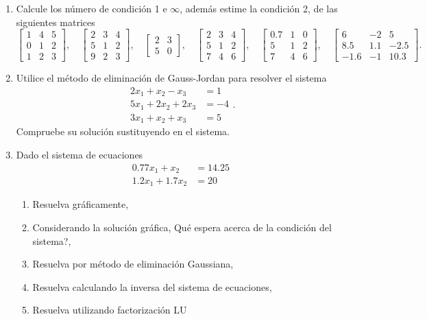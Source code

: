 \documentclass[11pt]{article}
\begin{document}
\begin{enumerate}
\item Calcule los n\'umero de condici\'on 1 e $\infty$, adem\'as estime la condici\'on 2, de las siguientes matrices
$$
\begin{bmatrix}
1 & 4 & 5 \\
0 & 1 & 2\\
1 & 2 & 3
\end{bmatrix}, 
\quad
\begin{bmatrix}
2 & 3 & 4 \\
5 & 1 & 2\\
9 & 2 & 3
\end{bmatrix}, 
\quad
\begin{bmatrix}
2 & 3 \\
5 & 0 
\end{bmatrix}, 
\quad
\begin{bmatrix}
2 & 3 & 4 \\
5 & 1 & 2\\
7 & 4 & 6
\end{bmatrix}, 
\quad
\begin{bmatrix}
0.7 & 1 & 0 \\
5 	& 1 & 2\\
7 	& 4 & 6
\end{bmatrix}, 
\quad
\begin{bmatrix}
6	& -2 	& 5 	\\
8.5 & 1.1	&-2.5 	\\
-1.6&-1 	& 10.3
\end{bmatrix}.
$$


\item Utilice el m\'etodo de eliminaci\'on de Gauss-Jordan para resolver el sistema
$$
\begin{array}{cl}
2x_1+x_2-x_3 	& =1\\
5x_1+2x_2+2x_3 	&=-4\\
3x_1+x_2+x_3	&=5
\end{array}.
$$
Compruebe su soluci\'on sustituyendo en el sistema.



\item Dado el sistema de ecuaciones 
$$
\begin{array}{cl}
0.77x_1+x_2 	&=14.25 \\
1.2x_1+1.7x_2 	&=20
\end{array}
$$

\begin{multicols}{2}
\begin{enumerate}
\item Resuelva gr\'aficamente, 
\item Considerando la soluci\'on gr\'afica, \textquestiondown Qu\'e espera acerca de la condici\'on del sistema?,
\item Resuelva por m\'etodo de eliminaci\'on Gaussiana,
\item Resuelva calculando la inversa del sistema de ecuaciones,
\item Resuelva utilizando factorizaci\'on LU
\end{enumerate}
\end{multicols}


\end{enumerate}
\end{document}
